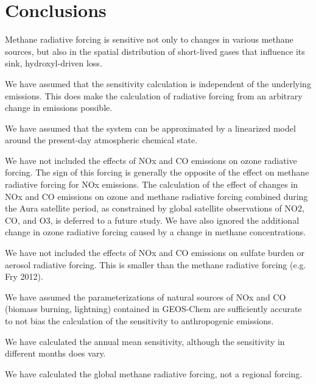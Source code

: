\section{Conclusions}

Methane radiative forcing is sensitive not only to changes in various methane sources, but also in the spatial distribution of short-lived gases that influence its sink, hydroxyl-driven loss.

We have assumed that the sensitivity calculation is independent of the underlying emissions. This does make the calculation of radiative forcing from an arbitrary change in emissions possible.

We have assumed that the system can be approximated by a linearized model around the present-day atmospheric chemical state.

We have not included the effects of NOx and CO emissions on ozone radiative forcing. The sign of this forcing is generally the opposite of the effect on methane radiative forcing for NOx emissions. The calculation of the effect of changes in NOx and CO emissions on ozone and methane radiative forcing combined during the Aura satellite period, as constrained by global satellite observations of NO2, CO, and O3, is deferred to a future study. We have also ignored the additional change in ozone radiative forcing caused by a change in methane concentrations.

We have not included the effects of NOx and CO emissions on sulfate burden or aerosol radiative forcing. This is smaller than the methane radiative forcing (e.g. Fry 2012).

We have assumed the parameterizations of natural sources of NOx and CO (biomass burning, lightning) contained in GEOS-Chem are sufficiently accurate to not bias the calculation of the sensitivity to anthropogenic emissions.

We have calculated the annual mean sensitivity, although the sensitivity in different months does vary.

We have calculated the global methane radiative forcing, not a regional forcing.

